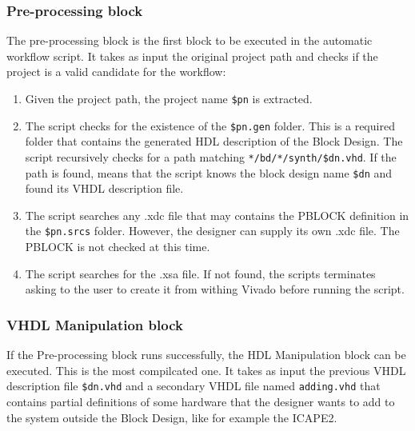 \subsubsection{Pre-processing block}
The pre-processing block is the first block to be executed in the automatic workflow script. It takes as input the original project path and checks if the project is a valid candidate for the workflow:

\begin{enumerate}
    \item Given the project path, the project name \texttt{\$pn} is extracted.
    \item The script checks for the existence of the \texttt{\$pn.gen} folder. This is a required folder that contains the generated HDL description of the Block Design. The script recursively checks for a path matching \texttt{*/bd/*/synth/\$dn.vhd}. If the path is found, means that the script knows the block design name \texttt{\$dn} and found its VHDL description file.
    \item The script searches any .xdc file that may contains the PBLOCK definition in the \texttt{\$pn.srcs} folder. However, the designer can supply its own .xdc file. The PBLOCK is not checked at this time.
    \item The script searches for the .xsa file. If not found, the scripts terminates asking to the user to create it from withing Vivado before running the script.
\end{enumerate}

\subsubsection{VHDL Manipulation block}
If the Pre-processing block runs successfully, the HDL Manipulation block can be executed. This is the most compilcated one. It takes as input the previous VHDL description file \texttt{\$dn.vhd} and a secondary VHDL file named \texttt{adding.vhd} that contains partial definitions of some hardware that the designer wants to add to the system outside the Block Design, like for example the ICAPE2. 

